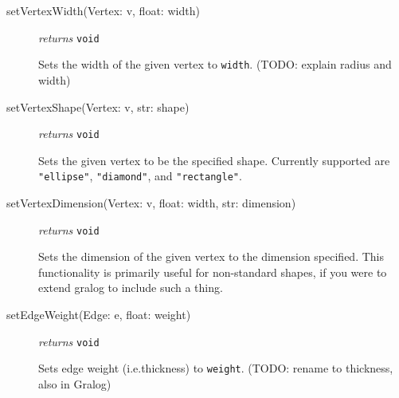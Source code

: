 \documentclass{article}
\begin{document}
\begin{description}
\item[setVertexWidth(Vertex: v, float: width)] \emph{returns}
  \texttt{void}

Sets the width of the given vertex to \texttt{width}. (TODO: explain
radius and width)

\item[setVertexShape(Vertex: v, str: shape)] \emph{returns} \texttt{void}

Sets the given vertex to be the specified shape. Currently supported
are \texttt{"{}ellipse"}, \texttt{"diamond"}, and \texttt{"rectangle"}.
  
\item[setVertexDimension(Vertex: v, float: width, str: dimension)]
  \emph{returns} \texttt{void}

Sets the dimension of the given vertex to the dimension specified. This functionality is primarily useful for non-standard shapes, if you were to extend gralog to include such a thing.  

\item[setEdgeWeight(Edge: e, float: weight)] \emph{returns} \texttt{void}

Sets edge weight (i.e.\@ thickness) to \texttt{weight}. (TODO: rename
to thickness, also in Gralog)
  
\end{description}
\end{document}
